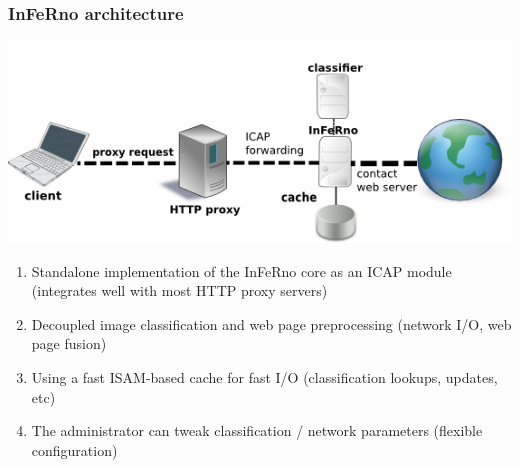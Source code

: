 \documentclass{beamer}
\begin{document}
\begin{frame}
\frametitle{InFeRno architecture}
\begin{center}
	\includegraphics[scale=0.6]{images/network_diagram.png}
	\begin{enumerate}
		\item Standalone implementation of the InFeRno core as an ICAP module (integrates well with most HTTP proxy servers)
		\item Decoupled image classification and web page preprocessing (network I/O, web page fusion)
		\item Using a fast ISAM-based cache for fast  I/O (classification lookups, updates, etc)
        \item The administrator can tweak classification / network parameters (flexible configuration)
	\end{enumerate}
\end{center}
\end{frame}
\end{document}
